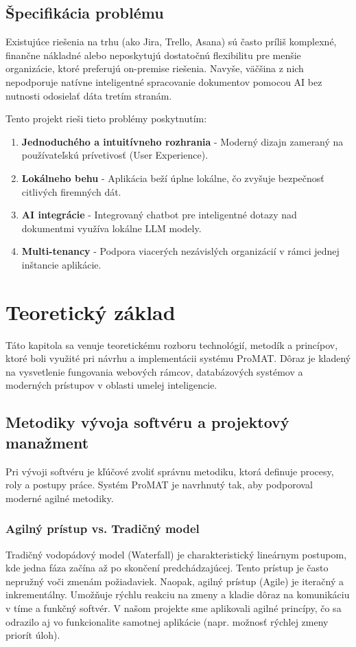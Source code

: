\documentclass[12pt, a4paper]{article}
\begin{document}
\begin{titlepage}
\subsection{Špecifikácia problému}
Existujúce riešenia na trhu (ako Jira, Trello, Asana) sú často príliš komplexné, finančne nákladné alebo neposkytujú dostatočnú flexibilitu pre menšie organizácie, ktoré preferujú on-premise riešenia. Navyše, väčšina z nich nepodporuje natívne inteligentné spracovanie dokumentov pomocou AI bez nutnosti odosielať dáta tretím stranám.

Tento projekt rieši tieto problémy poskytnutím:
\begin{enumerate}
    \item \textbf{Jednoduchého a intuitívneho rozhrania} - Moderný dizajn zameraný na používateľskú prívetivosť (User Experience).
    \item \textbf{Lokálneho behu} - Aplikácia beží úplne lokálne, čo zvyšuje bezpečnosť citlivých firemných dát.
    \item \textbf{AI integrácie} - Integrovaný chatbot pre inteligentné dotazy nad dokumentmi využíva lokálne LLM modely.
    \item \textbf{Multi-tenancy} - Podpora viacerých nezávislých organizácií v rámci jednej inštancie aplikácie.
\end{enumerate}

\newpage
\section{Teoretický základ}

Táto kapitola sa venuje teoretickému rozboru technológií, metodík a princípov, ktoré boli využité pri návrhu a implementácii systému ProMAT. Dôraz je kladený na vysvetlenie fungovania webových rámcov, databázových systémov a moderných prístupov v oblasti umelej inteligencie.

\subsection{Metodiky vývoja softvéru a projektový manažment}
Pri vývoji softvéru je kľúčové zvoliť správnu metodiku, ktorá definuje procesy, roly a postupy práce. Systém ProMAT je navrhnutý tak, aby podporoval moderné agilné metodiky.

\subsubsection{Agilný prístup vs. Tradičný model}
Tradičný vodopádový model (Waterfall) je charakteristický lineárnym postupom, kde jedna fáza začína až po skončení predchádzajúcej. Tento prístup je často nepružný voči zmenám požiadaviek. Naopak, agilný prístup (Agile) je iteračný a inkrementálny. Umožňuje rýchlu reakciu na zmeny a kladie dôraz na komunikáciu v tíme a funkčný softvér. V našom projekte sme aplikovali agilné princípy, čo sa odrazilo aj vo funkcionalite samotnej aplikácie (napr. možnosť rýchlej zmeny priorít úloh).


\end{titlepage}
\end{document}
